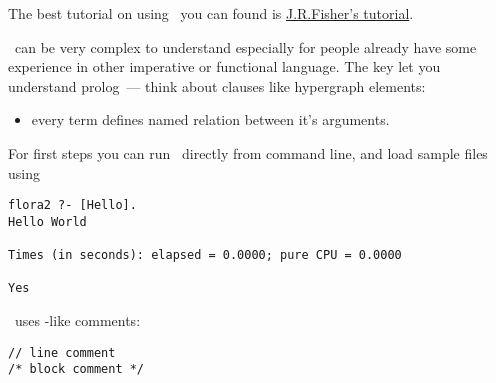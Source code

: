 \secdown

The best tutorial on using \prolog\ you can found is
\href{https://www.cpp.edu/~jrfisher/www/prolog_tutorial/contents.html}{J.R.Fisher's
tutorial}.

\bigskip
\prolog\ can be very complex to understand especially for people already have
some experience in other imperative or functional language. The key let you
understand prolog\ --- think about clauses like hypergraph elements:
\begin{itemize}
  \item 
every term defines named relation between it's arguments.
\end{itemize}

\clearpage
For first steps you can run \flora\ directly from command line, and load sample
files using



\begin{verbatim}
flora2 ?- [Hello].
Hello World

Times (in seconds): elapsed = 0.0000; pure CPU = 0.0000

Yes
\end{verbatim}



\flora\ uses \cpp-like comments:
\begin{verbatim}
// line comment
/* block comment */
\end{verbatim}

\secup
